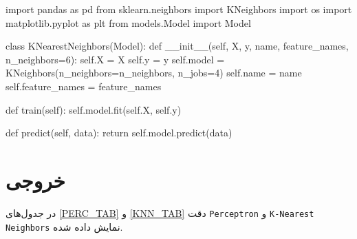 \begin{latin}
  \begin{python}
import pandas as pd
from sklearn.neighbors import KNeighbors
import os
import matplotlib.pyplot as plt
from models.Model import Model


class KNearestNeighbors(Model):
    def __init__(self, X, y, name, feature_names, n_neighbors=6):
        self.X = X
        self.y = y
        self.model = KNeighbors(n_neighbors=n_neighbors, n_jobs=4)
        self.name = name
        self.feature_names = feature_names

    def train(self):
        self.model.fit(self.X, self.y)

    def predict(self, data):
        return self.model.predict(data)
  \end{python}
\end{latin}

\section{خروجی}
در جدول‌های
\cref{PERC_TAB}
و
\cref{KNN_TAB}
دقت
\verb;Perceptron;
و
\verb;K-Nearest Neighbors;
نمایش داده شده.


